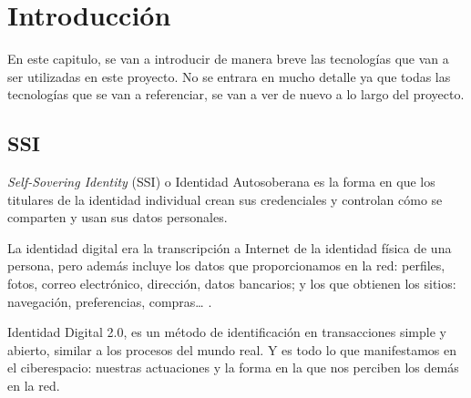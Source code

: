 \chapter{Introducción}\label{Introducción}

\thispagestyle{fancy}


En este capitulo, se van a introducir de manera breve las tecnologías que van a ser utilizadas en este proyecto. No se entrara en mucho detalle ya que todas las tecnologías que se van a referenciar, se van a ver de nuevo a lo largo del proyecto.
\section{SSI}
\textit{Self-Sovering Identity} (SSI) o Identidad Autosoberana es la forma en que los titulares de la identidad individual crean sus credenciales y controlan cómo se comparten y usan sus datos personales.\cite{web:ssi_wikipedia}

La identidad digital era la transcripción a Internet de la identidad física de una persona, pero además incluye los datos que proporcionamos en la red: perfiles, fotos, correo electrónico, dirección, datos bancarios; y los que obtienen los sitios: navegación, preferencias, compras… .

Identidad Digital 2.0, es un método de identificación en transacciones simple y abierto, similar a los procesos del mundo real.\cite{web:identidad2o_wikipedia} Y es todo lo que manifestamos en el ciberespacio: nuestras actuaciones y la forma en la que nos perciben los demás en la red.\cite{web:participacion}

